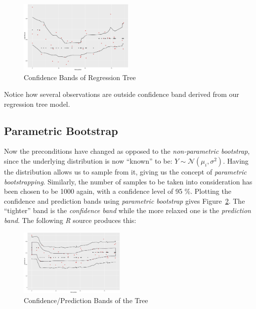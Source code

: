 \documentclass[a4paper, twocolumn]{article}
\begin{document}
        

        \begin{figure}[h!]
            \centering
            \caption{Confidence Bands of Regression Tree}
            \label{fig:confidence_bands}
            \includegraphics[width=0.5\textwidth]{share/A1_nonparametric.eps}
        \end{figure}

        Notice how several observations are outside confidence band derived from our regression tree model.

    \subsection*{Parametric Bootstrap}

        Now the preconditions have changed as opposed to the \emph{non-parametric bootstrap}, since the underlying distribution is now ``known'' to be: $Y \sim \mathcal{N}(\mu_i, \sigma^2)$. Having the distribution allows us to sample from it, giving us the concept of \emph{parametric bootstrapping}. Similarly, the number of samples to be taken into consideration has been chosen to be 1000 again, with a confidence level of 95 \%. Plotting the confidence and prediction bands using \emph{parametric bootstrap} gives Figure~\ref{fig:confpred_bands}. The ``tighter'' band is the \emph{confidence band} while the more relaxed one is the \emph{prediction band}. The following \emph{R} source produces this:

        

        \begin{figure}[h!]
            \centering
            \caption{Confidence/Prediction Bands of the Tree}
            \label{fig:confpred_bands}
            \includegraphics[width=0.46\textwidth]{share/A1_parametric.eps}
        \end{figure}
\end{document}
